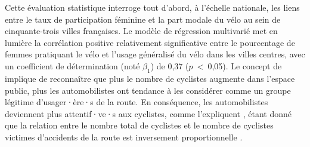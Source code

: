 \begin{refsegment}
Cette évaluation statistique interroge tout d'abord, à l'échelle nationale, les liens entre le taux de participation féminine et la part modale du vélo au sein de cinquante-trois villes françaises. Le modèle de régression multivarié met en lumière la corrélation positive relativement significative entre le pourcentage de femmes pratiquant le vélo et l'usage généralisé du vélo dans les villes centres, avec un coefficient de détermination (noté $\hat{\beta}_{1}$) de 0,37 ($p$~\textless~0,05). Le concept de  implique de reconnaître que plus le nombre de cyclistes augmente dans l'espace public, plus les automobilistes ont tendance à les considérer comme un groupe légitime d'usager·ère·s de la route. En conséquence, les automobilistes deviennent plus attentif·ve·s aux cyclistes, comme l'expliquent \textcolor{blue}{\textcite[83]{oosteren_pourquoi_2021}}, étant donné que la relation entre le nombre total de cyclistes et le nombre de cyclistes victimes d'accidents de la route est inversement proportionnelle \textcolor{blue}{\autocite[208]{jacobsen_safety_2003}}.%


\end{refsegment}
